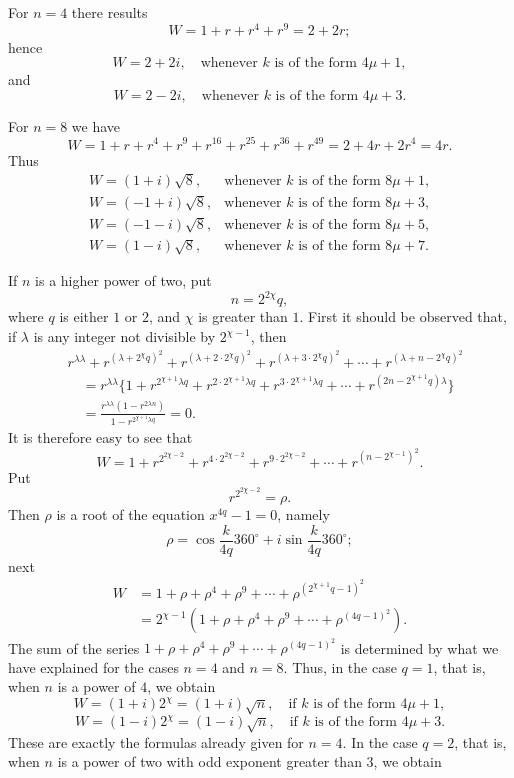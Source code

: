 \documentclass[12pt]{article}
\begin{document}
For $n=4$ there results
\[
W=1+r+r^4+r^9=2+2r;
\]
hence
\[
W=2+2i,\quad\text{whenever }k\text{ is of the form }4\mu+1,
\]
and
\[
W=2-2i,\quad\text{whenever }k\text{ is of the form }4\mu+3.
\]

For $n=8$ we have
\[
W=1+r+r^4+r^9+r^{16}+r^{25}+r^{36}+r^{49}=2+4r+2r^4=4r.
\]
Thus
\[
\begin{array}{ll}
W=(1+i)\sqrt8, & \text{whenever }k\text{ is of the form }8\mu+1,\\
W=(-1+i)\sqrt8, & \text{whenever }k\text{ is of the form }8\mu+3,\\
W=(-1-i)\sqrt8, & \text{whenever }k\text{ is of the form }8\mu+5,\\
W=(1-i)\sqrt8, & \text{whenever }k\text{ is of the form }8\mu+7.
\end{array}
\]

If $n$ is a higher power of two, put
\[
n=2^{2\chi}q,
\]
where $q$ is either $1$ or $2$, and $\chi$ is greater than $1$. First it should be observed that, if $\lambda$ is any integer not divisible by $2^{\chi-1}$, then
\[
\begin{aligned}
&r^{\lambda\lambda}+r^{(\lambda+2^\chi q)^2}+r^{(\lambda+2\cdot2^\chi q)^2}
+r^{(\lambda+3\cdot2^\chi q)^2}+\cdots+r^{(\lambda+n-2^\chi q)^2}\\
&\quad
=r^{\lambda\lambda}\{1+r^{2^{\chi+1}\lambda q}
+r^{2\cdot2^{\chi+1}\lambda q}
+r^{3\cdot2^{\chi+1}\lambda q}
+\cdots+r^{(2n-2^{\chi+1}q)\lambda}\}\\
&\quad
=\frac{r^{\lambda\lambda}(1-r^{2\lambda n})}{1-r^{2^{\chi+1}\lambda q}}=0.
\end{aligned}
\]
It is therefore easy to see that
\[
W=1+r^{2^{2\chi-2}}+r^{4\cdot 2^{2\chi-2}}+r^{9\cdot 2^{2\chi-2}}+\cdots+r^{(n-2^{\chi-1})^2}.
\]
Put
\[
r^{2^{2\chi-2}}=\rho.
\]
Then $\rho$ is a root of the equation $x^{4q}-1=0$, namely
\[
\rho=\cos\frac{k}{4q}360^\circ+i\sin\frac{k}{4q}360^\circ;
\]
next
\[
\begin{aligned}
W&=1+\rho+\rho^4+\rho^9+\cdots+\rho^{(2^{\chi+1}q-1)^2}\\
&=2^{\chi-1}(1+\rho+\rho^4+\rho^9+\cdots+\rho^{(4q-1)^2}).
\end{aligned}
\]
The sum of the series $1+\rho+\rho^4+\rho^9+\cdots+\rho^{(4q-1)^2}$ is determined by what we have explained for the cases $n=4$ and $n=8$. Thus, in the case $q=1$, that is, when $n$ is a power of $4$, we obtain
\[
W=(1+i)2^\chi=(1+i)\sqrt n,\quad\text{if }k\text{ is of the form }4\mu+1,
\]
\[
W=(1-i)2^\chi=(1-i)\sqrt n,\quad\text{if }k\text{ is of the form }4\mu+3.
\]
These are exactly the formulas already given for $n=4$. In the case $q=2$, that is, when $n$ is a power of two with odd exponent greater than $3$, we obtain
\end{document}
